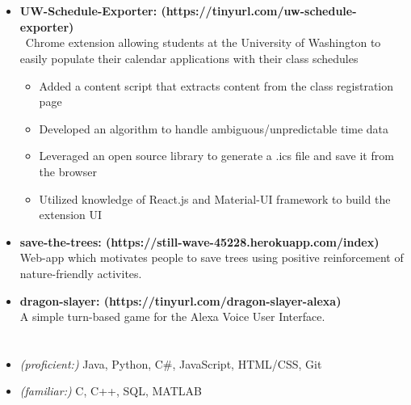 \documentclass[12pt]{article}
\begin{document}
\begin{spacing}{0.25}
\section*{\color{crimson}{Personal Projects}}
\begin{itemize}
\setlength\itemsep{0.1em}
    \item \textbf{UW-Schedule-Exporter: (https://tinyurl.com/uw-schedule-exporter)}\\\
    Chrome extension allowing students at the University of Washington to easily populate their calendar applications with their class schedules
    \begin{itemize}
        \item Added a content script that extracts content from the class registration page
        \item Developed an algorithm to handle ambiguous/unpredictable time data
        \item Leveraged an open source library to generate a .ics file and save it from the browser
        \item Utilized knowledge of React.js and Material-UI framework to build the extension UI
    \end{itemize}
    \item \textbf{save-the-trees: (https://still-wave-45228.herokuapp.com/index)}\\ Web-app which motivates people to save trees using positive reinforcement of nature-friendly activites.
    \item \textbf{dragon-slayer: (https://tinyurl.com/dragon-slayer-alexa)}\\ A simple turn-based game for the Alexa Voice User Interface.
\end{itemize}
\section*{\color{crimson}{Skills}}
    
    \begin{itemize}
        \item \textit{(proficient:)} Java, Python, C\#, JavaScript, HTML/CSS, Git
        \item \textit{(familiar:)} C, C++, SQL, MATLAB
    \end{itemize}
\end{spacing}
\end{document}
